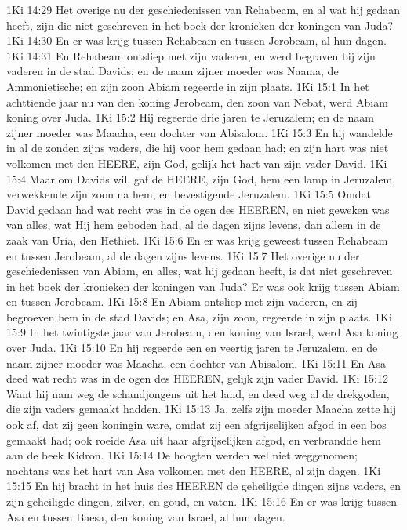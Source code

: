 1Ki 14:29  Het overige nu der geschiedenissen van Rehabeam, en al wat hij gedaan heeft, zijn die niet geschreven in het boek der kronieken der koningen van Juda?
1Ki 14:30  En er was krijg tussen Rehabeam en tussen Jerobeam, al hun dagen.
1Ki 14:31  En Rehabeam ontsliep met zijn vaderen, en werd begraven bij zijn vaderen in de stad Davids; en de naam zijner moeder was Naama, de Ammonietische; en zijn zoon Abiam regeerde in zijn plaats.
1Ki 15:1  In het achttiende jaar nu van den koning Jerobeam, den zoon van Nebat, werd Abiam koning over Juda.
1Ki 15:2  Hij regeerde drie jaren te Jeruzalem; en de naam zijner moeder was Maacha, een dochter van Abisalom.
1Ki 15:3  En hij wandelde in al de zonden zijns vaders, die hij voor hem gedaan had; en zijn hart was niet volkomen met den HEERE, zijn God, gelijk het hart van zijn vader David.
1Ki 15:4  Maar om Davids wil, gaf de HEERE, zijn God, hem een lamp in Jeruzalem, verwekkende zijn zoon na hem, en bevestigende Jeruzalem.
1Ki 15:5  Omdat David gedaan had wat recht was in de ogen des HEEREN, en niet geweken was van alles, wat Hij hem geboden had, al de dagen zijns levens, dan alleen in de zaak van Uria, den Hethiet.
1Ki 15:6  En er was krijg geweest tussen Rehabeam en tussen Jerobeam, al de dagen zijns levens.
1Ki 15:7  Het overige nu der geschiedenissen van Abiam, en alles, wat hij gedaan heeft, is dat niet geschreven in het boek der kronieken der koningen van Juda? Er was ook krijg tussen Abiam en tussen Jerobeam.
1Ki 15:8  En Abiam ontsliep met zijn vaderen, en zij begroeven hem in de stad Davids; en Asa, zijn zoon, regeerde in zijn plaats.
1Ki 15:9  In het twintigste jaar van Jerobeam, den koning van Israel, werd Asa koning over Juda.
1Ki 15:10  En hij regeerde een en veertig jaren te Jeruzalem, en de naam zijner moeder was Maacha, een dochter van Abisalom.
1Ki 15:11  En Asa deed wat recht was in de ogen des HEEREN, gelijk zijn vader David.
1Ki 15:12  Want hij nam weg de schandjongens uit het land, en deed weg al de drekgoden, die zijn vaders gemaakt hadden.
1Ki 15:13  Ja, zelfs zijn moeder Maacha zette hij ook af, dat zij geen koningin ware, omdat zij een afgrijselijken afgod in een bos gemaakt had; ook roeide Asa uit haar afgrijselijken afgod, en verbrandde hem aan de beek Kidron.
1Ki 15:14  De hoogten werden wel niet weggenomen; nochtans was het hart van Asa volkomen met den HEERE, al zijn dagen.
1Ki 15:15  En hij bracht in het huis des HEEREN de geheiligde dingen zijns vaders, en zijn geheiligde dingen, zilver, en goud, en vaten.
1Ki 15:16  En er was krijg tussen Asa en tussen Baesa, den koning van Israel, al hun dagen.
